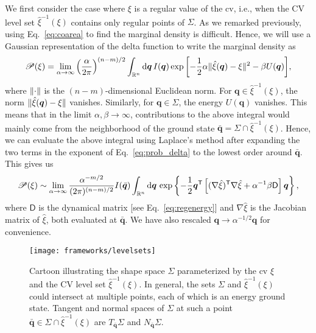 We first consider the case where $\xi$ is a regular value of the \ac{cv}, i.e., when the CV level set $\hat{\xi}^{-1}(\xi)$ contains only regular points of $\Sigma$.
As we remarked previously, using Eq.~\eqref{eq:coarea} to find the marginal density is difficult.
Hence, we will use a Gaussian representation of the delta function to write the marginal density as~\cite{hartmann2007a,hartmann2011}
%
\begin{equation}
  \mathscr{P}(\xi) = \lim_{\alpha\to\infty} \left(\frac{\alpha}{2\pi}\right)^{(n-m)/2} \int_{\mathbb{R}^n} \mathrm{d} \bm{q}\, I(\bm{q}) \exp{\left[-\frac{1}{2}\alpha\lVert\hat{\xi}(\bm{q}) - \xi\rVert^2 - \beta U(\bm{q})\right]},
  \label{eq:prob_delta}
\end{equation}
%
where $\lVert\cdot\rVert$ is the $(n-m)$-dimensional Euclidean norm.
For $\bm{q} \in \hat{\xi}^{-1}(\xi)$, the norm $\lVert\hat{\xi}(\bm{q}) - \xi\rVert$ vanishes.
Similarly, for $\bm{q} \in \Sigma$, the energy $U(\bm{q})$ vanishes.
This means that in the limit $\alpha, \beta \to \infty$, contributions to the above integral would mainly come from the neighborhood of the ground state $\bar{\bm{q}} = \Sigma \cap \hat{\xi}^{-1}(\xi)$.
Hence, we can evaluate the above integral using Laplace's method after expanding the two terms in the exponent of Eq.~\eqref{eq:prob_delta} to the lowest order around $\bar{\bm{q}}$.
This gives us
%
\begin{equation}
  \mathscr{P}(\xi) \sim \lim_{\alpha\to\infty} \frac{\alpha^{-m/2}}{(2\pi)^{(n-m)/2}}I(\bar{\bm{q}})\int_{\mathbb{R}^n} \mathrm{d}{\bm{q}}\, \exp\left\{-\frac{1}{2}\bm{q}^\mathsf{T}\left[(\nabla\hat{\xi})^\mathsf{T}\nabla\hat{\xi} + \alpha^{-1}\beta \mathsf{D}\right]\bm{q}\right\},
  \label{eq:prob_gaussian}
\end{equation}
%
where $\mathsf{D}$ is the dynamical matrix [see Eq.~\eqref{eq:regenergy}] and $\nabla\hat{\xi}$ is the Jacobian matrix of $\hat{\xi}$, both evaluated at $\bar{\bm{q}}$.
We have also rescaled $\bm{q} \to \alpha^{-1/2}\bm{q}$ for convenience.
%
\begin{figure}
  \begin{center}
    \texttt{[image: frameworks/levelsets]}
  \end{center}
  \caption{Cartoon illustrating the shape space $\Sigma$ parameterized by the \ac{cv} $\xi$ and the CV level set $\hat{\xi}^{-1}(\xi)$.
    In general, the sets $\Sigma$ and $\hat{\xi}^{-1}(\xi)$ could intersect at multiple points, each of which is an energy ground state.
    Tangent and normal spaces of $\Sigma$ at such a point $\bar{\bm{q}} \in \Sigma \cap \hat{\xi}^{-1}(\xi)$ are $T_{\bar{\bm{q}}}\Sigma$ and $N_{\bar{\bm{q}}}\Sigma$.}
  \label{fig:levelsets}
\end{figure}

